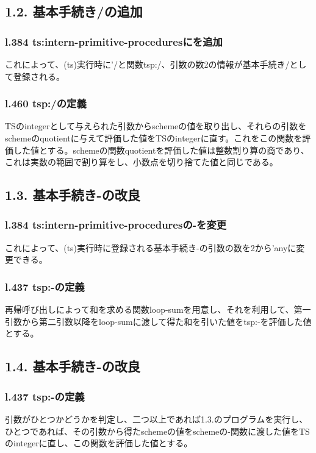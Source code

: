 \documentclass{jarticle}
\begin{document}
\subsection{1.2. 基本手続き/の追加}
\subsubsection{l.384 ts:intern-primitive-proceduresにを追加}
これによって、(ts)実行時に'/と関数tsp:/、引数の数2の情報が基本手続き/として登録される。\par
\subsubsection{l.460 tsp:/の定義}
TSのintegerとして与えられた引数からschemeの値を取り出し、それらの引数をschemeのquotientに与えて評価した値をTSのintegerに直す。これをこの関数を評価した値とする。schemeの関数quotientを評価した値は整数割り算の商であり、これは実数の範囲で割り算をし、小数点を切り捨てた値と同じである。\par

\subsection{1.3. 基本手続き-の改良}
\subsubsection{l.384 ts:intern-primitive-proceduresの-を変更}
これによって、(ts)実行時に登録される基本手続き-の引数の数を2から'anyに変更できる。\par
\subsubsection{l.437 tsp:-の定義}
再帰呼び出しによって和を求める関数loop-sumを用意し、それを利用して、第一引数から第二引数以降をloop-sumに渡して得た和を引いた値をtsp:-を評価した値とする。\par

\subsection{1.4. 基本手続き-の改良}
\subsubsection{l.437 tsp:-の定義}
引数がひとつかどうかを判定し、二つ以上であれば1.3.のプログラムを実行し、ひとつであれば、その引数から得たschemeの値をschemeの-関数に渡した値をTSのintegerに直し、この関数を評価した値とする。
\end{document}
